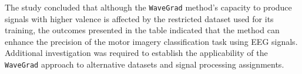 \documentclass[runningheads]{llncs}
\begin{document}
The study concluded that although the \texttt{WaveGrad} method's capacity to produce signals with higher valence is affected by the restricted dataset used for its training, the outcomes presented in the table indicated that the method can enhance the precision of the motor imagery classification task using EEG signals. Additional investigation was required to establish the applicability of the \texttt{WaveGrad} approach to alternative datasets and signal processing assignments.


 


\begin{table}[ht] 
\centering
\caption{\label{table: The Average accuracy improvement from our method on DA size level} The Average accuracy improvement from our method on DA size level}
\end{table}


\end{document}
